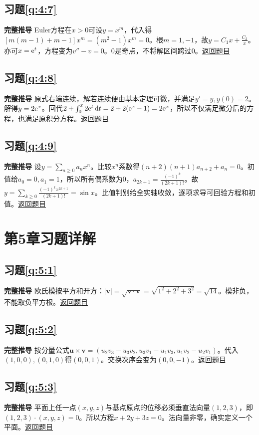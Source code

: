 \subsection*{习题\ref{q:4:7}}\label{a:4:7}\textbf{完整推导} Euler方程在$x>0$可设$y=x^m$，代入得$[m(m-1)+m-1]x^m=(m^2-1)x^m=0$。根$m=1,-1$，故$y=C_1x+\frac{C_2}{x}$。亦可$x=\mathrm{e}^t$，方程变为$v''-v=0$。0是奇点，不将解区间跨过0。\quad\hyperref[q:4:7]{返回题目}

\subsection*{习题\ref{q:4:8}}\label{a:4:8}\textbf{完整推导} 原式右端连续，解若连续便由基本定理可微，并满足$y'=y,y(0)=2$。解得$y=2\mathrm{e}^x$。回代$2+\int_0^x2\mathrm{e}^t\mathop{}\!\mathrm{d} t=2+2(\mathrm{e}^x-1)=2\mathrm{e}^x$，所以不仅满足微分后的方程，也满足原积分方程。\quad\hyperref[q:4:8]{返回题目}

\subsection*{习题\ref{q:4:9}}\label{a:4:9}\textbf{完整推导} 设$y=\sum_{n\ge0}a_nx^n$。比较$x^n$系数得$(n+2)(n+1)a_{n+2}+a_n=0$。初值给$a_0=0,a_1=1$，所以所有偶系数为0，$a_{2k+1}=\frac{(-1)^k}{(2k+1)!}$。故$y=\sum_{k\ge0}\frac{(-1)^kx^{2k+1}}{(2k+1)!}=\sin x$。比值判别给全实轴收敛，逐项求导可回验方程和初值。\quad\hyperref[q:4:9]{返回题目}

\section{第5章习题详解}

\subsection*{习题\ref{q:5:1}}\label{a:5:1}\textbf{完整推导} 欧氏模按平方和开方：$|\bm v|=\sqrt{\bm v\cdot\bm v}=\sqrt{1^2+2^2+3^2}=\sqrt{14}$。模非负，不能取负平方根。\quad\hyperref[q:5:1]{返回题目}

\subsection*{习题\ref{q:5:2}}\label{a:5:2}\textbf{完整推导} 按分量公式$\bm u\times\bm v=(u_2v_3-u_3v_2,u_3v_1-u_1v_3,u_1v_2-u_2v_1)$。代入$(1,0,0),(0,1,0)$得$(0,0,1)$。交换次序会变为$(0,0,-1)$。\quad\hyperref[q:5:2]{返回题目}

\subsection*{习题\ref{q:5:3}}\label{a:5:3}\textbf{完整推导} 平面上任一点$(x,y,z)$与基点原点的位移必须垂直法向量$(1,2,3)$，即$(1,2,3)\cdot(x,y,z)=0$。所以方程$x+2y+3z=0$。法向量非零，确实定义一个平面。\quad\hyperref[q:5:3]{返回题目}

